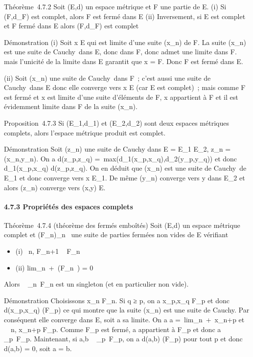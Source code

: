 \documentclass[]{article}
\begin{document}
Théorème~4.7.2 Soit (E,d) un espace métrique et F une partie de E. (i)
Si (F,d\_F) est complet, alors F est fermé dans E (ii)
Inversement, si E est complet et F fermé dans E alors (F,d\_F)
est complet

Démonstration (i) Soit x \in E qui est limite d'une suite (x\_n)
de F. La suite (x\_n) est une suite de Cauchy~dans E, donc dans
F, donc admet une limite \ell dans F. mais l'unicité de la limite dans E
garantit que x = \ell \in F. Donc F est fermé dans E.

(ii) Soit (x\_n) une suite de Cauchy~dans F~; c'est aussi une
suite de Cauchy~dans E donc elle converge vers x \in E (car E est
complet)~; mais comme F est fermé et x est limite d'une suite d'éléments
de F, x appartient à F et il est évidemment limite dans F de la suite
(x\_n).

Proposition~4.7.3 Si (E\_1,d\_1) et
(E\_2,d\_2) sont deux espaces métriques complets, alors
l'espace métrique produit est complet.

Démonstration Soit (z\_n) une suite de Cauchy dans E =
E\_1 \times E\_2, z\_n = (x\_n,y\_n).
On a d(z\_p,z\_q) =\
max(d\_1(x\_p,x\_q),d\_2(y\_p,y\_q))
et donc d\_1(x\_p,x\_q) \leq
d(z\_p,z\_q). On en déduit que (x\_n) est une
suite de Cauchy~de E\_1 et donc converge vers x \in E\_1.
De même (y\_n) converge vers y dans E\_2 et alors
(z\_n) converge vers (x,y) \in E.

\paragraph{4.7.3 Propriétés des espaces complets}

Théorème~4.7.4 (théorème des fermés emboîtés) Soit (E,d) un espace
métrique complet et (F\_n)\_n\in\mathbb{N}~ une suite de parties
fermées non vides de E vérifiant

\begin{itemize}
\itemsep1pt\parskip0pt
\item
  (i) \forall~n, F\_n+1 \subset~ F\_n~
\item
  (ii) lim\_n\rightarrow~+\infty~\delta(F\_n~) = 0
\end{itemize}

Alors \⋂ ~
\_n\in{}~F\_n est un singleton (et en particulier non vide).

Démonstration Choisissons x\_n \in F\_n. Si q ≥ p, on a
x\_p,x\_q \in F\_p et donc
d(x\_p,x\_q) \leq \delta(F\_p) ce qui montre que la
suite (x\_n) est une suite de Cauchy. Par conséquent elle
converge dans E, soit a sa limite. On a a =\
lim\_n\rightarrow~+\infty~x\_n+p et \forall~~n,
x\_n+p \in F\_p. Comme F\_p est fermé, a
appartient à F\_p et donc a
\in\⋂ ~
\_p\in{}~F\_p. Maintenant, si a,b
\in\⋂ ~
\_p\in\mathbb{N}~F\_p, on a d(a,b) \leq \delta(F\_p) pour tout p et
donc d(a,b) = 0, soit a = b.
\end{document}
